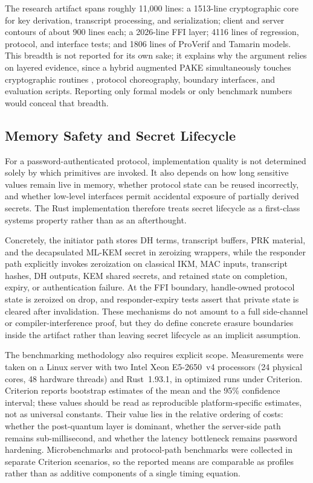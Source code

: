 \documentclass[conference]{IEEEtran}
\begin{document}
The research artifact spans roughly 11{,}000 lines: a 1513-line cryptographic core for key derivation, transcript processing, and serialization; client and server contours of about 900 lines each; a 2026-line FFI layer; 4116 lines of regression, protocol, and interface tests; and 1806 lines of ProVerif and Tamarin models. This breadth is not reported for its own sake; it explains why the argument relies on layered evidence, since a hybrid augmented PAKE simultaneously touches cryptographic routines \cite{gorbenko2019}, protocol choreography, boundary interfaces, and evaluation scripts. Reporting only formal models or only benchmark numbers would conceal that breadth.

\subsection{Memory Safety and Secret Lifecycle}

For a password-authenticated protocol, implementation quality is not determined solely by which primitives are invoked. It also depends on how long sensitive values remain live in memory, whether protocol state can be reused incorrectly, and whether low-level interfaces permit accidental exposure of partially derived secrets. The Rust implementation therefore treats secret lifecycle as a first-class systems property rather than as an afterthought.

Concretely, the initiator path stores DH terms, transcript buffers, PRK material, and the decapsulated ML-KEM secret in zeroizing wrappers, while the responder path explicitly invokes zeroization on classical IKM, MAC inputs, transcript hashes, DH outputs, KEM shared secrets, and retained state on completion, expiry, or authentication failure. At the FFI boundary, handle-owned protocol state is zeroized on drop, and responder-expiry tests assert that private state is cleared after invalidation. These mechanisms do not amount to a full side-channel or compiler-interference proof, but they do define concrete erasure boundaries inside the artifact rather than leaving secret lifecycle as an implicit assumption.


The benchmarking methodology also requires explicit scope. Measurements were taken on a Linux server with two Intel Xeon E5-2650~v4 processors (24 physical cores, 48 hardware threads) and Rust~1.93.1, in optimized runs under Criterion. Criterion reports bootstrap estimates of the mean and the 95\% confidence interval; these values should be read as reproducible platform-specific estimates, not as universal constants. Their value lies in the relative ordering of costs: whether the post-quantum layer is dominant, whether the server-side path remains sub-millisecond, and whether the latency bottleneck remains password hardening. Microbenchmarks and protocol-path benchmarks were collected in separate Criterion scenarios, so the reported means are comparable as profiles rather than as additive components of a single timing equation.
\end{document}
